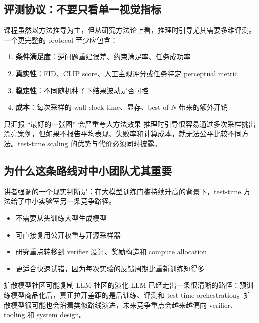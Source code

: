 \documentclass[a4paper]{article}
\begin{document}
\subsection{评测协议：不要只看单一视觉指标}

课程虽然以方法推导为主，但从研究方法论上看，推理时引导尤其需要多维评测。一个更完整的 protocol 至少应包含：

\begin{enumerate}
    \item \textbf{条件满足度}：逆问题重建误差、约束满足率、任务成功率
    \item \textbf{真实性}：FID、CLIP score、人工主观评分或任务特定 perceptual metric
    \item \textbf{稳定性}：不同随机种子下结果波动是否可控
    \item \textbf{成本}：每次采样的 wall-clock time、显存、best-of-$N$ 带来的额外开销
\end{enumerate}

\begin{warningbox}{只汇报 ``最好的一张图'' 会严重夸大方法效果}
推理时引导很容易通过多次采样挑出漂亮案例，但如果不报告平均表现、失败率和计算成本，就无法公平比较不同方法。test-time scaling 的优势与代价必须同时披露。
\end{warningbox}

\subsection{为什么这条路线对中小团队尤其重要}

讲者强调的一个现实判断是：在大模型训练门槛持续升高的背景下，test-time 方法给了中小实验室另一条竞争路径。

\begin{itemize}
    \item 不需要从头训练大型生成模型
    \item 可直接复用公开权重与开源采样器
    \item 研究重点转移到 verifier 设计、奖励构造和 compute allocation
    \item 更适合快速试错，因为每次实验的反馈周期比重新训练短得多
\end{itemize}

\begin{knowledgebox}{扩散模型社区可能复制 LLM 社区的演化}
LLM 已经走出一条很清晰的路径：预训练模型商品化后，真正拉开差距的是后训练、评测和 test-time orchestration。扩散模型很可能也会沿着类似路线演进，未来竞争重点会越来越偏向 verifier、tooling 和 system design。
\end{knowledgebox}
\end{document}
